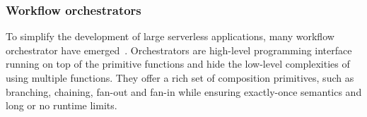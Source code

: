 



\subsubsection{Workflow orchestrators}

To simplify the development of large serverless applications, many workflow
orchestrator have emerged~\cite{excamera, gg-atc, aws-step-functions,
google-cloud-composer, google-workflows, durable-functions}. Orchestrators
are  high-level programming interface running on top of the primitive
functions and hide the low-level complexities of using multiple functions.
They offer a  rich set of composition primitives, such as branching,
chaining, fan-out and fan-in while ensuring exactly-once semantics and
long or no runtime limits.


